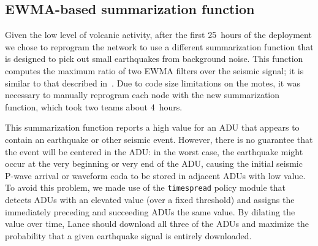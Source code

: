 



\subsection{EWMA-based summarization function}
\label{lance-sec-ewma-deployment}

Given the low level of volcanic activity, after the first 25~hours of
the deployment we chose to reprogram the network to use a different
summarization function that is designed to pick out small earthquakes
from background noise. This function computes the maximum ratio of two
EWMA filters over the seismic signal; it is similar to that described
in~\cite{volcano-osdi06}. Due to code size limitations on
the motes, it was necessary to manually reprogram each node with the
new summarization function, which took two teams about 4~hours.


This summarization function reports a high value for an ADU
that appears to contain an earthquake or other seismic event. 
However, there is no guarantee that the event will be centered in the
ADU: in the worst case, the earthquake might occur at the very
beginning or very end of the ADU, causing the initial seismic P-wave arrival
or waveform coda to be stored in adjacent ADUs with low value.
To avoid this problem, we made use of the {\tt timespread} policy
module that detects ADUs with
an elevated value (over a fixed threshold) and assigns the
immediately preceding and succeeding ADUs the same value.
By dilating the value over time, Lance should download
all three of the ADUs and maximize the probability that a given
earthquake signal is entirely downloaded.

